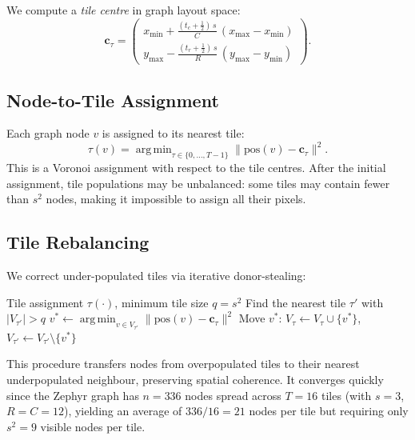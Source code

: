 \documentclass[11pt,a4paper]{article}
\DeclareMathOperator*{\argmin}{arg\,min}
\begin{document}
We compute a \emph{tile centre} in graph layout space:
\begin{equation}\label{eq:tilecenter}
  \mathbf{c}_\tau = 
  \begin{pmatrix}
    x_{\min} + \frac{(t_c+\tfrac{1}{2})\,s}{C}\,(x_{\max} - x_{\min}) \\[4pt]
    y_{\max} - \frac{(t_r+\tfrac{1}{2})\,s}{R}\,(y_{\max} - y_{\min})
  \end{pmatrix}.
\end{equation}

\subsection{Node-to-Tile Assignment}

Each graph node $v$ is assigned to its nearest tile:
\begin{equation}\label{eq:nodetile}
  \tau(v) = \argmin_{\tau \in \{0,\ldots,T-1\}} \|\mathrm{pos}(v) - \mathbf{c}_\tau\|^2.
\end{equation}
This is a Voronoi assignment with respect to the tile centres.  After the initial assignment, tile populations may be unbalanced: some tiles may contain fewer than $s^2$ nodes, making it impossible to assign all their pixels.

\subsection{Tile Rebalancing}\label{sec:rebalance}

We correct under-populated tiles via iterative donor-stealing:

\begin{algorithm}[H]
\caption{Tile Rebalancing}\label{alg:rebalance}
\begin{algorithmic}[1]
\Require Tile assignment $\tau(\cdot)$, minimum tile size $q = s^2$
    \State Find the nearest tile $\tau'$ with $|V_{\tau'}| > q$
    \State $v^* \gets \argmin_{v \in V_{\tau'}} \|\mathrm{pos}(v) - \mathbf{c}_\tau\|^2$
    \State Move $v^*$: \; $V_\tau \gets V_\tau \cup \{v^*\}$, \; $V_{\tau'} \gets V_{\tau'}\setminus\{v^*\}$
  \EndWhile
\EndFor
\end{algorithmic}
\end{algorithm}

This procedure transfers nodes from overpopulated tiles to their nearest underpopulated neighbour, preserving spatial coherence.  It converges quickly since the Zephyr graph has $n=336$ nodes spread across $T=16$ tiles (with $s=3$, $R=C=12$), yielding an average of $336/16=21$ nodes per tile but requiring only $s^2=9$ visible nodes per tile.
\end{document}
